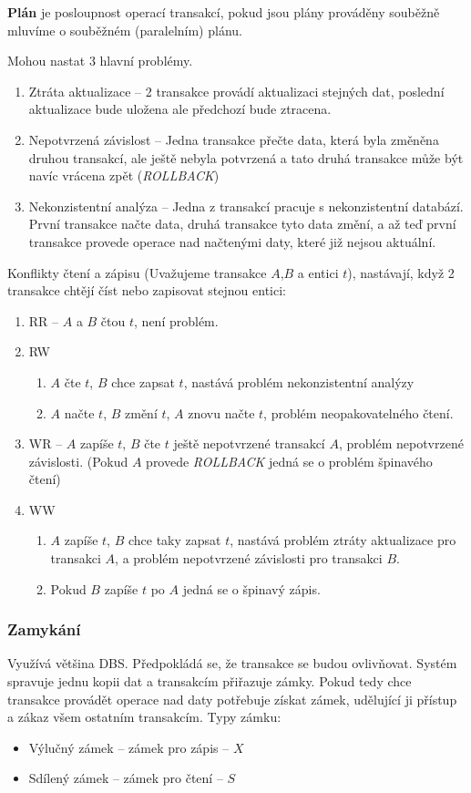 \textbf{Plán} je posloupnost operací transakcí, pokud jsou plány prováděny souběžně mluvíme o souběžném (paralelním) plánu.

Mohou nastat 3 hlavní problémy.
\begin{enumerate}
\item Ztráta aktualizace -- 2 transakce provádí aktualizaci stejných dat, poslední aktualizace bude uložena ale předchozí bude ztracena.
\item Nepotvrzená závislost -- Jedna transakce přečte data, která byla změněna druhou transakcí, ale ještě nebyla potvrzená a tato druhá transakce může být navíc vrácena zpět (\textit{ROLLBACK})
\item Nekonzistentní analýza -- Jedna z transakcí pracuje s nekonzistentní databází. První transakce načte data, druhá transakce tyto data změní, a až teď první transakce provede operace nad načtenými daty, které již nejsou aktuální.
\end{enumerate}

Konflikty čtení a zápisu (Uvažujeme transakce $A$,$B$ a entici $t$), nastávají, když 2 transakce chtějí číst nebo zapisovat stejnou entici:
\begin{enumerate}
\item RR -- $A$ a $B$ čtou $t$, není problém.
\item RW
	\begin{enumerate}
	\item $A$ čte $t$, $B$ chce zapsat $t$, nastává problém nekonzistentní analýzy
	\item $A$ načte $t$, $B$ změní $t$, $A$ znovu načte $t$, problém neopakovatelného čtení.
	\end{enumerate}
\item WR -- $A$ zapíše $t$, $B$ čte $t$ ještě nepotvrzené transakcí $A$, problém nepotvrzené závislosti. 
	(Pokud $A$ provede \textit{ROLLBACK} jedná se o problém špinavého čtení)
\item WW
	\begin{enumerate}
	\item $A$ zapíše $t$, $B$ chce taky zapsat $t$, nastává problém ztráty aktualizace pro transakci $A$, a problém nepotvrzené závislosti 
	pro transakci $B$.
	\item Pokud $B$ zapíše $t$ po $A$ jedná se o špinavý zápis.
	\end{enumerate}
\end{enumerate}

\subsubsection{Zamykání}
Využívá většina DBS. Předpokládá se, že transakce se budou ovlivňovat. Systém spravuje jednu kopii dat a transakcím přiřazuje zámky. Pokud tedy chce transakce provádět operace nad daty potřebuje získat zámek, udělující ji přístup a zákaz všem ostatním transakcím. Typy zámku:
\begin{itemize}
\item Výlučný zámek -- zámek pro zápis – $X$
\item Sdílený zámek – zámek pro čtení – $S$
\end{itemize}

